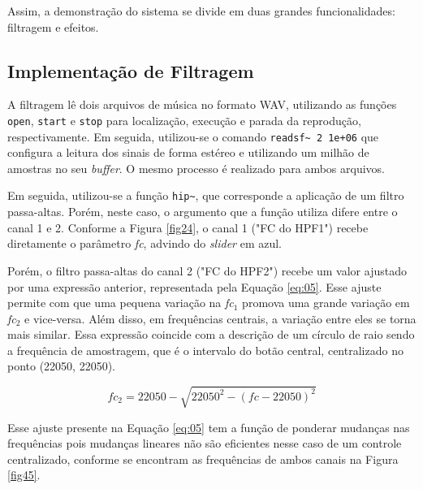 Assim, a demonstração do sistema se divide em duas grandes funcionalidades: filtragem e efeitos.

\subsection{Implementação de Filtragem}

A filtragem lê dois arquivos de música no formato WAV, utilizando as funções \texttt{open}, \texttt{start} e \texttt{stop} para localização, execução e parada da reprodução, respectivamente. Em seguida, utilizou-se o comando \texttt{readsf\textasciitilde\ 2 1e+06} que configura a leitura dos sinais de forma estéreo e utilizando um milhão de amostras no seu \textit{buffer}. O mesmo processo é realizado para ambos arquivos.

Em seguida, utilizou-se a função \texttt{hip\textasciitilde}, que corresponde a aplicação de um filtro passa-altas. Porém, neste caso, o argumento que a função utiliza difere entre o canal 1 e 2. Conforme a Figura \ref{fig24}, o canal 1 ("FC do HPF1") recebe diretamente o parâmetro \textit{fc}, advindo do \textit{slider} em azul.

Porém, o filtro passa-altas do canal 2 ("FC do HPF2") recebe um valor ajustado por uma expressão anterior, representada pela Equação \ref{eq:05}. Esse ajuste permite com que uma pequena variação na \textit{fc$_{1}$} promova uma grande variação em \textit{fc$_{2}$} e vice-versa. Além disso, em frequências centrais, a variação entre eles se torna mais similar. Essa expressão coincide com a descrição de um círculo de raio sendo a frequência de amostragem, que é o intervalo do botão central, centralizado no ponto (22050, 22050).

\begin{equation}  \label{eq:05}
    fc_2 = 22050 - \sqrt{22050^2 - (fc - 22050)^2}
\end{equation}

Esse ajuste presente na Equação \ref{eq:05} tem a função de ponderar mudanças nas frequências pois mudanças lineares não são eficientes nesse caso de um controle centralizado, conforme se encontram as frequências de ambos canais na Figura \ref{fig45}.

